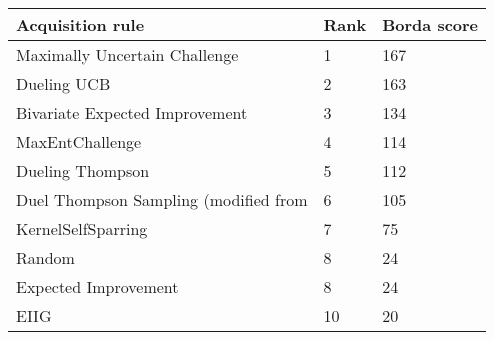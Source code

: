 \begin{tabular}{lll}
Acquisition rule & Rank & Borda score \\ 
\hline 
Maximally Uncertain Challenge                                 & 1 & 167 \\ 
Dueling UCB \citep{Benavoli2020}                           & 2 & 163 \\ 
Bivariate Expected Improvement \citep{Nielsen2015}         & 3 & 134 \\ 
MaxEntChallenge                                            & 4 & 114 \\ 
Dueling Thompson \citep{Benavoli2020}                      & 5 & 112 \\ 
Duel Thompson Sampling (modified from \citet{Gonzalez2017} & 6 & 105 \\ 
KernelSelfSparring \citep{Sui2017}                         & 7 & 75 \\ 
Random                                                     & 8 & 24 \\ 
Expected Improvement \citep{Brochu2010a}                   & 8 & 24 \\ 
EIIG \citep{Benavoli2020}                                  & 10 & 20 \\ 
\hline 
\end{tabular}